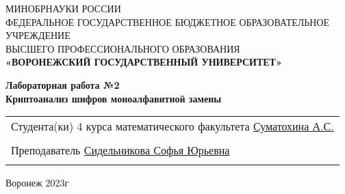 \thispagestyle{empty}
\begin{center}
	\hfill \break
	\large{МИНОБРНАУКИ РОССИИ}\\
	\footnotesize{ФЕДЕРАЛЬНОЕ ГОСУДАРСТВЕННОЕ БЮДЖЕТНОЕ ОБРАЗОВАТЕЛЬНОЕ УЧРЕЖДЕНИЕ}\\
	\footnotesize{ВЫСШЕГО ПРОФЕССИОНАЛЬНОГО ОБРАЗОВАНИЯ}\\
	\small{\textbf{«ВОРОНЕЖСКИЙ ГОСУДАРСТВЕННЫЙ УНИВЕРСИТЕТ»}}\\

	\hfill \break
	\hfill \break
	\hfill \break
	\hfill \break
	\hfill \break
	\hfill \break
	\hfill \break
	\hfill \break
	\hfill \break

	\large\textbf{Лабораторная работа №2}\\
	\large\textbf{Криптоанализ шифров моноалфавитной замены}\\
\end{center}

\hfill \break
\hfill \break
\hfill \break
\hfill \break
\hfill \break
\hfill \break
\hfill \break


\begin{tabular}{p{}}
	Студента(ки) 4 курса математического факультета \newline
	\underline{Суматохина А.С.} \\
	\\
	Преподаватель \newline
	\underline{Сидельникова Софья Юрьевна} \\                 \\
\end{tabular}

\hfill \break
\hfill \break
\hfill \break
\hfill \break
\hfill \break
\hfill \break
\hfill \break
\hfill \break
\hfill \break
\hfill \break
\hfill \break
\begin{center}
	Воронеж 2023г
\end{center}
\newpage